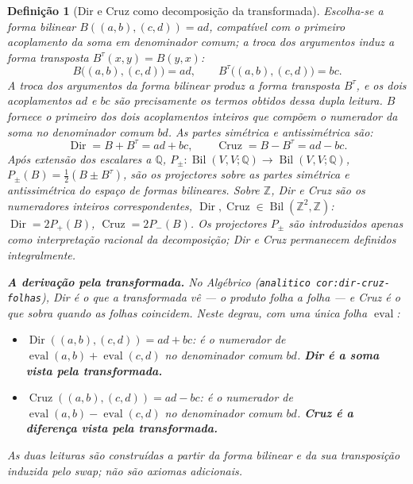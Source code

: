 \documentclass[11pt,a4paper]{article}
\newtheorem{definicao}{Definição}
\newcommand{\code}[1]{\texttt{\small #1}}
\begin{document}
\begin{definicao}[Dir e Cruz como decomposição da
transformada]\label{def:dircr}
Escolha-se a forma bilinear $B((a,b),(c,d))=ad$, compatível com o primeiro
acoplamento da soma em denominador comum; a troca dos argumentos induz a forma
transposta $B^{\tau}(x,y)=B(y,x)$:
\[
B\bigl((a,b),(c,d)\bigr) = ad,\qquad
B^{\tau}\bigl((a,b),(c,d)\bigr) = bc.
\]
A troca dos argumentos da forma bilinear produz a forma transposta $B^{\tau}$,
e os dois acoplamentos $ad$ e $bc$ são precisamente os termos obtidos dessa
dupla leitura. $B$ fornece o primeiro dos dois acoplamentos inteiros que
compõem o numerador da soma no denominador comum $bd$.
As partes simétrica e antissimétrica são:
\[
\boxed{\;
\operatorname{Dir} = B + B^{\tau} = ad+bc,
\qquad
\operatorname{Cruz} = B - B^{\tau} = ad-bc.
\;}
\]
Após extensão dos escalares a $\mathbb{Q}$,
$P_{\pm}:\operatorname{Bil}(V,V;\mathbb{Q})\to
\operatorname{Bil}(V,V;\mathbb{Q})$, $P_{\pm}(B)=\frac{1}{2}(B\pm B^{\tau})$,
são os projectores sobre as partes simétrica e antissimétrica do espaço de
formas bilineares. Sobre $\mathbb{Z}$, Dir e Cruz são os numeradores inteiros
correspondentes, $\operatorname{Dir},\operatorname{Cruz}\in
\operatorname{Bil}(\mathbb{Z}^{2},\mathbb{Z})$:
$\operatorname{Dir}=2P_{+}(B)$, $\operatorname{Cruz}=2P_{-}(B)$.
Os projectores $P_{\pm}$ são introduzidos apenas como interpretação racional
da decomposição; Dir e Cruz permanecem definidos integralmente.

\medskip\noindent\textbf{A derivação pela transformada.} No Algébrico
(\code{analitico cor:dir-cruz-folhas}), Dir é o que a transformada vê --- o produto
folha a folha --- e Cruz é o que sobra quando as folhas coincidem. Neste
degrau, com uma única folha $\operatorname{eval}$:
\begin{itemize}
\item $\operatorname{Dir}((a,b),(c,d)) = ad+bc$: é o numerador de
  $\operatorname{eval}(a,b)+\operatorname{eval}(c,d)$ no denominador comum
  $bd$. \textbf{Dir é a soma vista pela transformada.}
\item $\operatorname{Cruz}((a,b),(c,d)) = ad-bc$: é o numerador de
  $\operatorname{eval}(a,b)-\operatorname{eval}(c,d)$ no denominador comum
  $bd$. \textbf{Cruz é a diferença vista pela transformada.}
\end{itemize}
As duas leituras são construídas a partir da forma bilinear e da sua
transposição induzida pelo swap;
não são axiomas adicionais.
\end{definicao}
\end{document}
